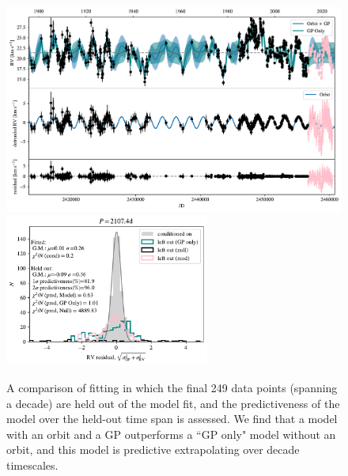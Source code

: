 \documentclass[twocolumn]{aastex631}
\begin{document}
\begin{figure}[p]
    \centering
    \includegraphics[width=\textwidth]{figures/drop_predict_rvtime_gp.pdf}
    \includegraphics[width=0.6\textwidth]{figures/drop_predict_residual_histogram_gp.pdf}
    \caption{A comparison of fitting in which the final 249 data points (spanning a decade) are held out of the model fit, and the predictiveness of the model over the held-out time span is assessed. We find that a model with an orbit and a GP outperforms a ``GP only" model without an orbit, and this model is predictive extrapolating over decade timescales.  }
    \label{fig:dropsampleGP}
\end{figure}
\end{document}
